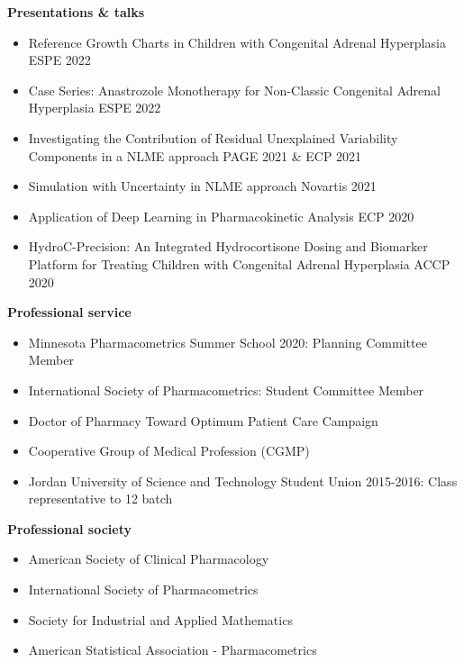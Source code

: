 \documentclass[a4paper,11pt]{article}
\begin{document}
\printbibliography[title=In preparation, keyword=ongoing]

\printbibliography[title=Posters \& abstracts,keyword=poster]
\newpage
{\centering\textbf{Presentations \& talks}}
\begin{itemize}
    \item Reference Growth Charts in Children with Congenital Adrenal Hyperplasia \hfill ESPE 2022
    \item Case Series: Anastrozole Monotherapy for Non-Classic Congenital Adrenal Hyperplasia \hfill ESPE 2022
    \item Investigating the Contribution of Residual Unexplained Variability Components in a NLME approach \hfill  PAGE 2021 \& ECP 2021
    \item Simulation with Uncertainty in NLME approach \hfill Novartis 2021
    \item Application of Deep Learning in Pharmacokinetic Analysis \hfill ECP 2020
    \item HydroC-Precision: An Integrated Hydrocortisone Dosing and Biomarker Platform for Treating Children with Congenital Adrenal Hyperplasia \hfill ACCP 2020
\end{itemize}
\textbf{Professional service}
\begin{itemize}
\item Minnesota Pharmacometrics Summer School 2020: Planning Committee Member
\item International Society of Pharmacometrics: Student Committee Member
\item Doctor of Pharmacy Toward Optimum Patient Care Campaign
\item Cooperative Group of Medical Profession (CGMP)
\item  Jordan University of Science and Technology Student Union 2015-2016: Class representative to 12 batch
\end{itemize}
\textbf{Professional society}
\begin{itemize}
    \item American Society of Clinical Pharmacology
    \item International Society of Pharmacometrics
    \item Society for Industrial and Applied Mathematics
    \item American Statistical Association - Pharmacometrics
\end{itemize}
\end{document}
